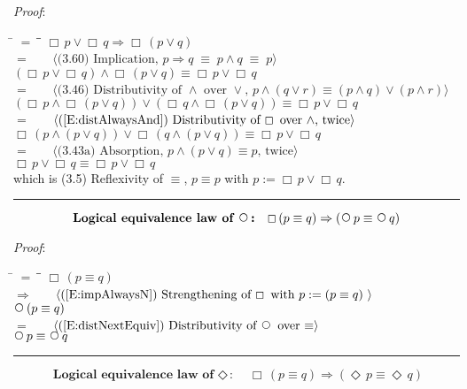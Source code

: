 \documentclass[12pt, fleqn, leqno]{article}
\newcommand{\lgap}{2pt}                             %
\newcommand{\mymathindent}{24pt}                    %
\newcommand{\equivs}{\ensuremath{\;\equiv\;}}       %
\newcommand{\impl}{\ensuremath{\Rightarrow}}        %
\newcommand{\Next}{\;\,\text{\raisebox{3.5pt}{\circle{6}}}}
\newcommand{\Event}{\Diamond\,}
\newcommand{\Always}{\Box\,}
\newcommand{\myqed}{\rule[-.23ex]{1.2ex}{2.0ex}}
\newcommand{\myqedtab}{\hspace{384pt}}              %
\newcommand{\Gll} {\langle}                         %
\newcommand{\Ggg} {\rangle}                         %
\newcommand{\Hint}[1]     {\ \ \ $\Gll              \mbox{#1} \Ggg$ }   %
\begin{document}
\emph{Proof}:
\begin{tabbing}
\hspace{\mymathindent} \= $= \;$ \= \myqedtab \= \kill
  \> \>   $\Always p \lor \Always q \impl \Always(p \lor q)$\\[\lgap]
  \> $=$  \>  \Hint{(3.60) Implication, $p\impl q \equivs p\land q \equivs p$}\\[\lgap]
  \> \>   $(\Always p \lor \Always q) \land \Always(p \lor q) \equiv \Always p \lor \Always q$\\[\lgap]
  \> $=$  \>  \Hint{(3.46) Distributivity of $\land$ over $\lor$, $p\land (q\lor r)\equiv (p\land q)\lor (p\land r)$}\\[\lgap]
  \> \>   $(\Always p \land \Always (p \lor q)) \lor (\Always q \land \Always (p \lor q)) \equiv \Always p \lor \Always q$\\[\lgap]
  \> $=$  \>  \Hint{(\ref{E:distAlwaysAnd}) Distributivity of $\Always$ over $\land$, twice}\\[\lgap]
  \> \>   $\Always(p \land (p \lor q)) \lor \Always(q \land (p \lor q)) \equiv \Always p \lor \Always q$\\[\lgap]
  \> $=$  \>  \Hint{(3.43a) Absorption, $p \land (p \lor q) \equiv p$, twice}\\[\lgap]
  \> \>   $\Always p \lor \Always q \equiv \Always p \lor \Always q$\\[\lgap]
  \> which is (3.5) Reflexivity of $\equiv$, $p\equiv p$ with $p:=\Always p \lor \Always q$. \quad \myqed
\end{tabbing}
\begin{equation}\label{E:distNextEquiv2}
\textbf{Logical equivalence law of $\Next$:}\quad \Always (p \equiv q) \impl (\Next p \equiv \Next q)
\end{equation}

\emph{Proof}:
\begin{tabbing}
\hspace{\mymathindent} \= $= \;$ \= \myqedtab \= \kill
  \> \>   $\Always (p \equiv q) $\\[\lgap]
  \> $\impl$  \>  \Hint{(\ref{E:impAlwaysN}) Strengthening of $\Always$ with $p:=(p \equiv q)$ }\\[\lgap]
  \> \>   $\Next (p \equiv q) $\\[\lgap]
  \> $=$  \>  \Hint{(\ref{E:distNextEquiv}) Distributivity of $\Next$ over $\equiv$}\\[\lgap]
  \> \>   $\Next p \equiv  \Next q$\quad \myqed
\end{tabbing}
\begin{equation}\label{E:LELevent}
\textbf{Logical equivalence law of $\Event$:}\quad \Always (p \equiv q) \impl (\Event p \equiv \Event q)
\end{equation}
\end{document}
